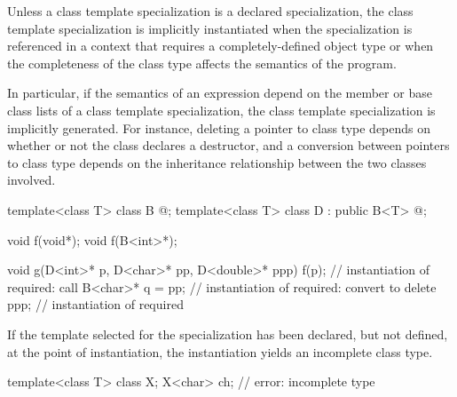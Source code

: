 \pnum
{}%
Unless a class template specialization is a declared specialization,
the class template specialization is implicitly instantiated when the
specialization is referenced in a context that requires a completely-defined
object type or when the completeness of the class type affects the semantics
of the program.
\begin{note}
In particular, if the semantics of an expression depend on the member or
base class lists of a class template specialization, the class template
specialization is implicitly generated. For instance, deleting a pointer
to class type depends on whether or not the class declares a destructor,
and a conversion between pointers to class type depends on the
inheritance relationship between the two classes involved.
\end{note}
\begin{example}
\begin{codeblock}
template<class T> class B { @\commentellip@ };
template<class T> class D : public B<T> { @\commentellip@ };

void f(void*);
void f(B<int>*);

void g(D<int>* p, D<char>* pp, D<double>* ppp) {
  f(p);             // instantiation of  required: call 
  B<char>* q = pp;  // instantiation of  required: convert  to 
  delete ppp;       // instantiation of  required
}
\end{codeblock}
\end{example}
If the template selected for the specialization
has been declared, but not defined,
at the point of instantiation,
the instantiation yields an incomplete class type.
\begin{example}
\begin{codeblock}
template<class T> class X;
X<char> ch;         // error: incomplete type 
\end{codeblock}
\end{example}

